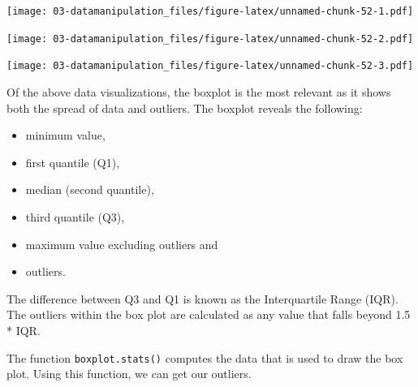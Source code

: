 \documentclass[
]{book}
\newenvironment{Shaded}{\begin{snugshade}}{\end{snugshade}}
\newcommand{\CommentTok}[1]{\textcolor[rgb]{0.56,0.35,0.01}{\textit{#1}}}
\newcommand{\FunctionTok}[1]{\textcolor[rgb]{0.00,0.00,0.00}{#1}}
\newcommand{\NormalTok}[1]{#1}
\newcommand{\SpecialCharTok}[1]{\textcolor[rgb]{0.00,0.00,0.00}{#1}}
\providecommand{\tightlist}{%
  \setlength{\itemsep}{0pt}\setlength{\parskip}{0pt}}
\begin{document}
\texttt{[image: 03-datamanipulation\_files/figure-latex/unnamed-chunk-52-1.pdf]}

\begin{Shaded}
\end{Shaded}

\texttt{[image: 03-datamanipulation\_files/figure-latex/unnamed-chunk-52-2.pdf]}

\begin{Shaded}
\end{Shaded}

\texttt{[image: 03-datamanipulation\_files/figure-latex/unnamed-chunk-52-3.pdf]}

Of the above data visualizations, the boxplot is the most relevant as it shows both the spread of data and outliers. The boxplot reveals the following:

\begin{itemize}
\tightlist
\item
  minimum value,
\item
  first quantile (Q1),
\item
  median (second quantile),
\item
  third quantile (Q3),
\item
  maximum value excluding outliers and
\item
  outliers.
\end{itemize}

The difference between Q3 and Q1 is known as the Interquartile Range (IQR). The outliers within the box plot are calculated as any value that falls beyond 1.5 * IQR.

The function \texttt{boxplot.stats()} computes the data that is used to draw the box plot. Using this function, we can get our outliers.

\begin{Shaded}
\end{Shaded}
\end{document}
